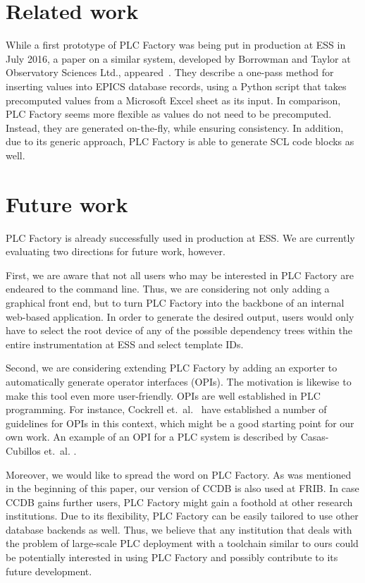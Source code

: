\documentclass[a4paper,
              ]{jacow}
\begin{document}
\section{Related work}
While a first prototype of PLC Factory was being put in production at ESS in July 2016, a paper on a similar system, developed by Borrowman and Taylor at Observatory Sciences Ltd., appeared~\cite{Borrowman}. They describe a one-pass method for inserting values into EPICS database records, using a Python script that takes precomputed values from a Microsoft Excel sheet as its input. In comparison, PLC Factory seems more flexible as values do not need to be precomputed. Instead, they are generated on-the-fly, while ensuring consistency. In addition, due to its generic approach, PLC Factory is able to generate SCL code blocks as well.



\section{Future work}
PLC Factory is already successfully used in production at ESS. We are currently evaluating two directions for future work, however.

First, we are aware that not all users who may be interested in PLC Factory are endeared to the command line. Thus, we are considering not only adding a graphical front end, but to turn PLC Factory into the backbone of an internal web-based application. In order to generate the desired output, users would only  have to select the root device of any of the possible dependency trees within the entire instrumentation at ESS and select template IDs.

Second, we are considering extending PLC Factory by adding an exporter to automatically generate operator interfaces (OPIs). The motivation is likewise to make this tool even more user-friendly. OPIs are well established in PLC programming. For instance, Cockrell et.\ al.\ \cite{Cockrell1992} have established a number of guidelines for OPIs in this context, which might be a good starting point for our own work. An example of an OPI for a PLC system is described by Casas-Cubillos et.\ al. \cite{CasasCubillos2002}.

Moreover, we would like to spread the word on PLC Factory. As was mentioned in the beginning of this paper, our version of CCDB is also used at FRIB. In case CCDB gains further users, PLC Factory might gain a foothold at other research institutions. Due to its flexibility, PLC Factory can be easily tailored to use other database backends as well. Thus, we believe that any institution that deals with the problem of large-scale PLC deployment with a toolchain similar to ours could be potentially interested in using PLC Factory and possibly contribute to its future development.
\end{document}
